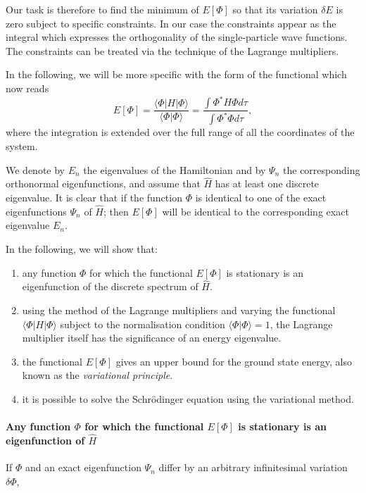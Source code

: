 Our task is therefore to find the minimum of $E[\Phi]$ so that its variation $\delta E$ is zero  subject to specific
constraints. In our case the constraints appear as the integral which expresses the orthogonality of the  single-particle wave functions.
The constraints can be treated via the technique of the Lagrange multipliers.

In the following, we will be more specific with the form of the functional which now reads
\begin{equation}
\label{eq:functional}
 E[\Phi]= \frac{\langle \Phi |H | \Phi \rangle}{\langle \Phi | \Phi \rangle}= \frac{ \int \Phi^* H  \Phi d \tau}{\int  \Phi^*  \Phi d \tau},
\end{equation} 
where the integration is extended over the full range of all the coordinates of the system.

We denote by $E_n$ the eigenvalues of the Hamiltonian and by $\Psi_n$ the corresponding orthonormal eigenfunctions, and assume that $\hat{H}$ has at least one discrete eigenvalue. 
It is clear that if the function $\Phi$ is identical to one of the exact eigenfunctions $\Psi_n$ of $\hat{H}$; then $E[\Phi]$ will be identical to the corresponding exact eigenvalue $E_n$.

In the following, we will show that:
\begin{enumerate}
 \item any function $\Phi$ for which the functional $E[\Phi]$ is stationary is an eigenfunction of the discrete spectrum of $\hat{H}$.
\item using the method of the Lagrange multipliers and varying the functional $\langle \Phi |H | \Phi \rangle$ subject to the normalisation condition $\langle \Phi | \Phi \rangle=1$, the Lagrange multiplier itself has the significance of an energy eigenvalue.
\item the functional $E[\Phi]$ gives an upper bound for the ground state energy, also known as the \textit{variational principle}.
\item it is possible to solve the Schr\"odinger equation using the variational method.
\end{enumerate}

\paragraph{Any function $\Phi$ for which the functional $E[\Phi]$ is stationary is an eigenfunction of $\hat{H}$}
If $\Phi$ and an exact eigenfunction $\Psi_n$ differ by an arbitrary infinitesimal variation $\delta \Phi$,

